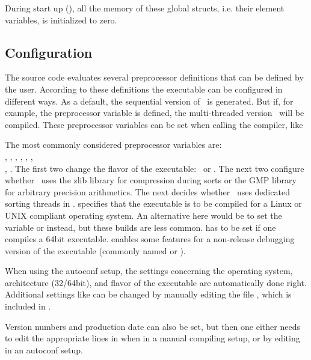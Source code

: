 During start up (), all the memory of these global structs, i.e. their element variables, is
initialized to zero.

\subsection{Configuration}

The source code evaluates several preprocessor definitions that can be defined by the user.
According to these definitions the executable can be configured in different ways. As a default, the
sequential version of \FORM\ is generated. But if, for example, the preprocessor variable
 is defined, the multi-threaded version \TFORM\ will be compiled. These preprocessor
variables can be set when calling the compiler, like


The most commonly considered preprocessor variables are: \\ , ,
, , , , \\ , . The first two
change the flavor of the executable: \TFORM\ or \PARFORM. The next two configure whether \FORM\ uses
the zlib library for compression during sorts or the GMP library for arbitrary precision arithmetics.
The next decides whether \FORM\ uses dedicated sorting  threads in \TFORM. 
specifies that the executable is to be compiled for a Linux or UNIX compliant operating system. An
alternative here would be to set the variable  or  instead, but these builds are
less common.  has to be set if one compiles a 64bit executable.  enables
some features for a non-release debugging version of the executable (commonly named  or
).

When using the autoconf setup, the settings concerning the operating system, architecture (32/64bit), and
flavor of the executable are automatically done right. Additional settings like  can be
changed by manually editing the file , which is included in .

Version numbers and production date can also be set, but then one either needs to edit the
appropriate lines in  when in a manual compiling setup, or by editing  in
an autoconf setup.
